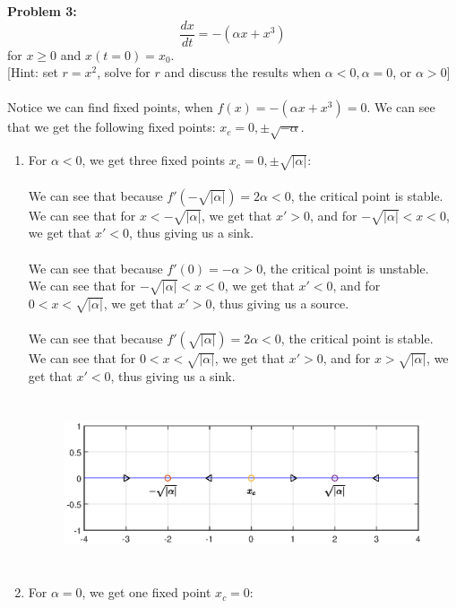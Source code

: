 \documentclass[11pt]{article}
\newenvironment{problem}[1]{\textbf{Problem #1: }}{\newpage}
\begin{document}
	\begin{problem}{3}
		$$\frac{dx}{dt} = -(\alpha x + x^3)$$
		for $x \geq 0$ and $x(t=0) = x_0$.
		\\
		{[Hint: set $r = x^2$, solve for $r$ and discuss the results when $\alpha < 0, \alpha = 0$, or $\alpha > 0$]}
		\\ \\
		Notice we can find fixed points, when $f(x) = -(\alpha x + x^3) = 0$.  We can see that we get the following fixed points: $x_c = 0, \pm \sqrt{-\alpha}$.
		\begin{enumerate}[label = (\alph*)]
			\item 	For $\alpha < 0$, we get three fixed points $x_c = 0, \pm \sqrt{|\alpha|}$:
			\\ \\
			We can see that because $f'(-\sqrt{|\alpha|}) = 2\alpha < 0$, the critical point is stable. \\
			We can see that for $x < -\sqrt{|\alpha|}$, we get that $x' > 0$, and for $-\sqrt{|\alpha|} < x < 0$, we get that $x' < 0$, thus giving us a sink.
			\\ \\
			We can see that because $f'(0) = -\alpha > 0$, the critical point is unstable. \\
			We can see that for $-\sqrt{|\alpha|} < x < 0$, we get that $x'< 0$, and for $0 < x < \sqrt{|\alpha|}$, we get that $x' > 0$, thus giving us a source.
			\\ \\
			We can see that because $f'(\sqrt{|\alpha|}) = 2\alpha < 0$, the critical point is stable. \\
			We can see that for $0 < x < \sqrt{|\alpha|}$, we get that $x' > 0$, and for $x > \sqrt{|\alpha|}$, we get that $x' < 0$, thus giving us a sink.
			\begin{figure}[h!]
				\includegraphics[width = 16cm, height = 5cm]{PhaseLine3a.eps}
			\end{figure}
			\newpage
			\item For $\alpha = 0$, we get one fixed point $x_c = 0$:

\end{enumerate}
\end{problem}
\end{document}
